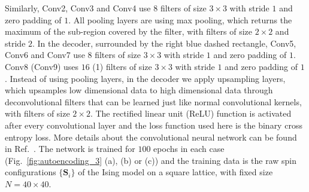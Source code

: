 \documentclass[pra,letterpaper,10pt,twocolumn]{revtex4}
\begin{document}
Similarly, Conv2, Conv3 and Conv4 use $8$ filters of size $3\times 3$
with stride $1$ and zero padding of $1$. All pooling layers are using
max pooling, which returns the maximum of the sub-region covered by the
filter, with filters of size $2\times 2$ and stride $2$. In the decoder,
surrounded by the right blue dashed rectangle, Conv5, Conv6 and Conv7
use $8$ filters of size $3\times 3$ with stride $1$ and zero padding of
$1$. Conv8 (Conv9) uses $16$ (1) filters of size $3\times 3$ with stride $1$ and
zero padding of $1$. Instead of using pooling layers, in the decoder we
apply upsampling layers, which upsamples low dimensional data to high
dimensional data through deconvolutional filters that can be learned
just like normal convolutional kernels, with filters of size $2\times
2$. The rectified linear unit (ReLU) function is activated after every
convolutional layer and the loss function used here is the binary cross
entropy loss. More details about the convolutional neural network can be
found in Ref.~. The network is trained for
$100$ epochs in each case (Fig.~\ref{fig:autoencoding_3} (a), (b) or
(c)) and the training data is the raw spin configurations
$\{\mathbf{S}_i\}$ of the Ising model on a square lattice, with fixed
size $N=40\times 40$.
\end{document}
